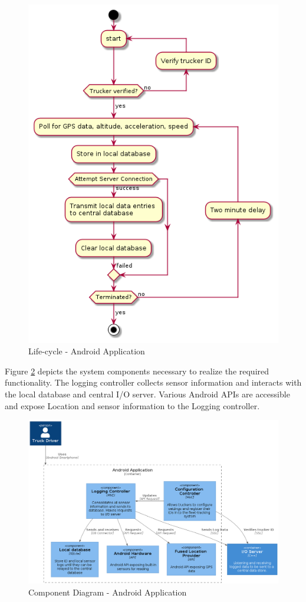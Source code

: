 \begin{figure}[H]
\centering
\includegraphics[scale=0.6]{android_activity.png}
\caption{Life-cycle - Android Application}
\label{fig:android_activity}
\end{figure}

Figure \ref{fig:android_component} depicts the system components necessary to realize the required functionality.
The logging controller collects sensor information and interacts with the local database and central I/O server.
Various Android APIs are accessible and expose Location and sensor information to the Logging controller.
\begin{figure}[H]
\centering
\includegraphics[width=6in]{android_component.png}
\caption{Component Diagram - Android Application}
\label{fig:android_component}
\end{figure}

